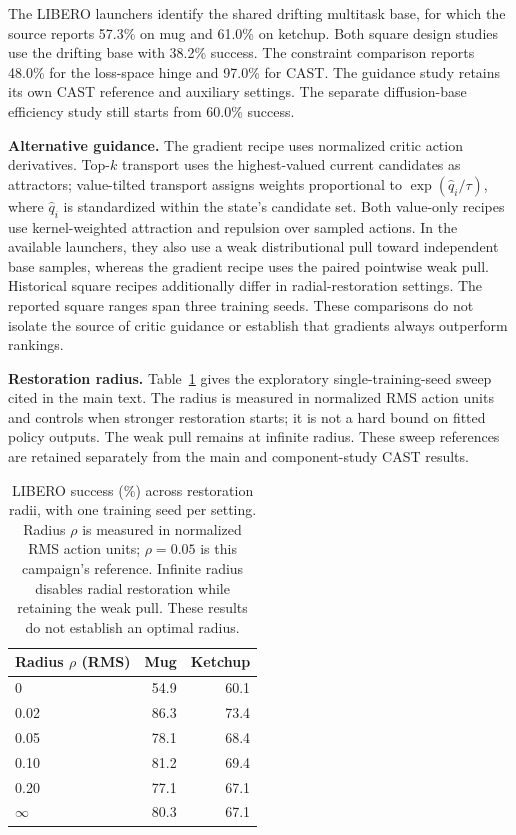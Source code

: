 The LIBERO launchers identify the shared drifting multitask base, for
which the source reports 57.3\% on mug and 61.0\% on ketchup. Both square
design studies use the drifting base with 38.2\% success. The constraint
comparison reports 48.0\% for the loss-space hinge and 97.0\% for CAST.
The guidance study retains its own CAST reference and auxiliary settings.
The separate
diffusion-base efficiency study still starts from 60.0\% success.

\textbf{Alternative guidance.}
The gradient recipe uses normalized critic action derivatives. Top-$k$
transport uses the highest-valued current candidates as attractors;
value-tilted transport assigns weights proportional to
$\exp(\hat q_i/\tau)$, where $\hat q_i$ is standardized within the
state's candidate set. Both value-only recipes use kernel-weighted
attraction and repulsion over sampled actions. In the available launchers,
they also use a weak distributional pull toward independent base samples,
whereas the gradient recipe uses the paired pointwise weak pull. Historical
square recipes additionally differ in radial-restoration settings. The
reported square ranges span three training seeds. These comparisons do
not isolate the source of critic guidance or establish that gradients
always outperform rankings.

\textbf{Restoration radius.}
Table~\ref{supp:radius} gives the exploratory single-training-seed sweep
cited in the main text. The radius is measured in normalized RMS action
units and controls when stronger restoration starts; it is not a hard
bound on fitted policy outputs. The weak pull remains at infinite radius.
These sweep references are retained separately from the main and
component-study CAST results.
\begin{table}[H]
\centering
\caption{LIBERO success (\%) across restoration radii, with one training
seed per setting. Radius $\rho$ is measured in normalized RMS action
units; $\rho=0.05$ is this campaign's reference. Infinite radius disables
radial restoration while retaining the weak pull. These results do not
establish an optimal radius.}
\label{supp:radius}
\small
\begin{tabular}{@{}lrr@{}}
\toprule
Radius $\rho$ (RMS) & Mug & Ketchup \\
\midrule
0 & 54.9 & 60.1 \\
0.02 & 86.3 & 73.4 \\
0.05 & 78.1 & 68.4 \\
0.10 & 81.2 & 69.4 \\
0.20 & 77.1 & 67.1 \\
$\infty$ & 80.3 & 67.1 \\
\bottomrule
\end{tabular}
\end{table}


